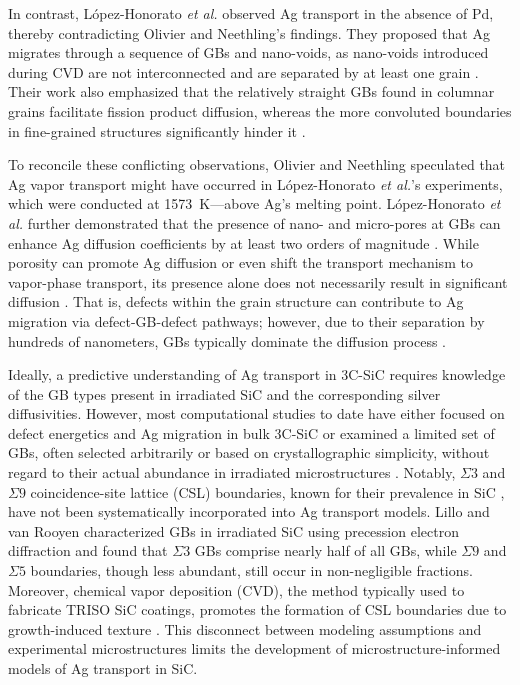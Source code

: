 \documentclass[%
preprint,
amsmath,amssymb,
aps,
]{revtex4-2}
\newcommand{\?}{\stackrel{?}{=}}
\begin{document}
In contrast, López-Honorato \textit{et al.} \cite{Lopez-Honorato2010, Lopez-Honorato2011} observed Ag transport in the absence of Pd, thereby contradicting Olivier and Neethling's findings. They proposed that Ag migrates through a sequence of GBs and nano-voids, as nano-voids introduced during CVD are not interconnected and are separated by at least one grain \cite{Lopez-Honorato2010}. Their work also emphasized that the relatively straight GBs found in columnar grains facilitate fission product diffusion, whereas the more convoluted boundaries in fine-grained structures significantly hinder it \cite{Petti2003, Lopez-Honorato2010}.

To reconcile these conflicting observations, Olivier and Neethling \cite{Olivier2013} speculated that Ag vapor transport might have occurred in López-Honorato \textit{et al.}’s experiments, which were conducted at 1573~K---above Ag's melting point. López-Honorato \textit{et al.} further demonstrated that the presence of nano- and micro-pores at GBs can enhance Ag diffusion coefficients by at least two orders of magnitude \cite{Lopez-Honorato2011}. While porosity can promote Ag diffusion or even shift the transport mechanism to vapor-phase transport, its presence alone does not necessarily result in significant diffusion \cite{Lopez-Honorato2011, VanRooyen2014}. That is, defects within the grain structure can contribute to Ag migration via defect-GB-defect pathways; however, due to their separation by hundreds of nanometers, GBs typically dominate the diffusion process \cite{Lopez-Honorato2011}.

Ideally, a predictive understanding of Ag transport in 3C-SiC requires knowledge of the GB types present in irradiated SiC and the corresponding silver diffusivities. However, most computational studies to date have either focused on defect energetics and Ag migration in bulk 3C-SiC \cite{Shrader2011, Jiang2021} or examined a limited set of GBs, often selected arbitrarily or based on crystallographic simplicity, without regard to their actual abundance in irradiated microstructures \cite{Khalil2011, Aagesen2022, Ko2016}. Notably, $\Sigma 3$ and $\Sigma 9$ coincidence-site lattice (CSL) boundaries, known for their prevalence in SiC \cite{Lillo2016,Kirchhofer2013,Randle2011}, have not been systematically incorporated into Ag transport models. Lillo and van Rooyen \cite{Lillo2016} characterized GBs in irradiated SiC using precession electron diffraction and found that $\Sigma 3$ GBs comprise nearly half of all GBs, while $\Sigma 9$ and $\Sigma 5$ boundaries, though less abundant, still occur in non-negligible fractions. Moreover, chemical vapor deposition (CVD), the method typically used to fabricate TRISO SiC coatings, promotes the formation of CSL boundaries due to growth-induced texture \cite{Tanaka2002}. This disconnect between modeling assumptions and experimental microstructures limits the development of microstructure-informed models of Ag transport in SiC.
\end{document}
